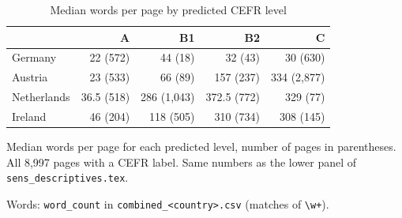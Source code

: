 \begin{table}[htbp]
\centering
\begin{threeparttable}
\caption{Median words per page by predicted CEFR level}
\label{tab:words-by-level}
\begin{tabular}{lrrrr}
\hline
 & A & B1 & B2 & C \\
\hline
Germany & 22 (572) & 44 (18) & 32 (43) & 30 (630) \\
Austria & 23 (533) & 66 (89) & 157 (237) & 334 (2,877) \\
Netherlands & 36.5 (518) & 286 (1,043) & 372.5 (772) & 329 (77) \\
Ireland & 46 (204) & 118 (505) & 310 (734) & 308 (145) \\
\hline
\end{tabular}
\begin{tablenotes}
\footnotesize
\item Median words per page for each predicted level, number of pages in parentheses. All 8,997 pages with a CEFR label. Same numbers as the lower panel of \texttt{sens\_descriptives.tex}.
\item Words: \texttt{word\_count} in \texttt{combined\_<country>.csv} (matches of \texttt{\textbackslash w+}).
\end{tablenotes}
\end{threeparttable}
\end{table}
